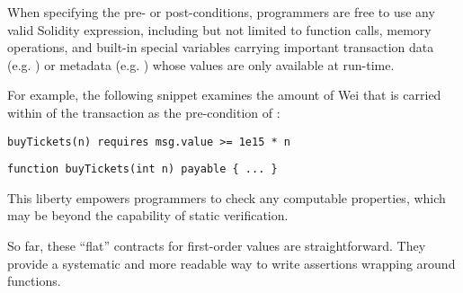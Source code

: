 When specifying the pre- or post-conditions, programmers are free to use
any valid Solidity expression, including but not limited
to function calls, memory operations, and built-in special variables carrying
important transaction data (e.g. ) or metadata (e.g.
) whose values are only available at run-time.

For example, the following snippet examines the amount of Wei that is carried within 
of the transaction as the pre-condition of :
\begin{lstlisting}[language=Consol]
buyTickets(n) requires msg.value >= 1e15 * n
\end{lstlisting}
\vspace{-0.25em}
\begin{lstlisting}
function buyTickets(int n) payable { ... }
\end{lstlisting}
This liberty empowers programmers to check any computable properties, 
which may be beyond the capability of static verification.


So far, these ``flat'' contracts for first-order values are straightforward.
They provide a systematic and more readable way to write assertions wrapping around functions.

